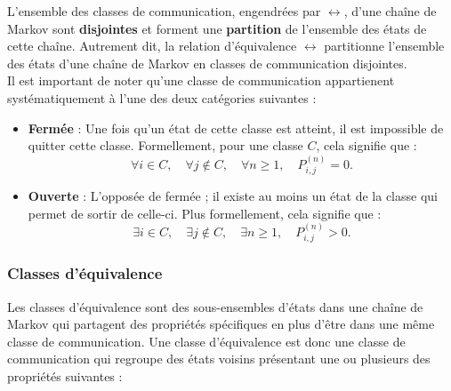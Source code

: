 \documentclass{article}
\begin{document}
L'ensemble des classes de communication, engendrées par $\leftrightarrow$, d'une chaîne de Markov sont \textbf{disjointes} et forment une \textbf{partition} de l'ensemble des états de cette chaîne.
Autrement dit, la relation d'équivalence $\leftrightarrow$ partitionne l'ensemble des états d'une chaîne de Markov en classes de communication disjointes. \\ %

Il est important de noter qu'une classe de communication appartienent systématiquement à l'une des deux catégories suivantes :
\begin{itemize}
\item \textbf{Fermée} : Une fois qu'un état de cette classe est atteint, il est impossible de quitter cette classe. Formellement, pour une classe $C$, cela signifie que :
  \[
  \forall i \in C, \quad \forall j \notin C, \quad \forall n \geq 1, \quad P_{i,j}^{(n)} = 0.
  \]
\item \textbf{Ouverte} : L'opposée de fermée ; il existe au moins un état de la classe qui permet de sortir de celle-ci. Plus formellement, cela signifie que :
  \[
  \exists i \in C, \quad \exists j \notin C, \quad \exists n \geq 1, \quad P_{i,j}^{(n)} > 0.
  \]
\end{itemize}


\subsubsection{Classes d'équivalence}

Les classes d'équivalence sont des sous-ensembles d'états dans une chaîne de Markov qui partagent des propriétés spécifiques en plus d'être dans une même classe de communication. Une classe d'équivalence est donc une classe de communication qui regroupe des états voisins présentant une ou plusieurs des propriétés suivantes :
\end{document}
